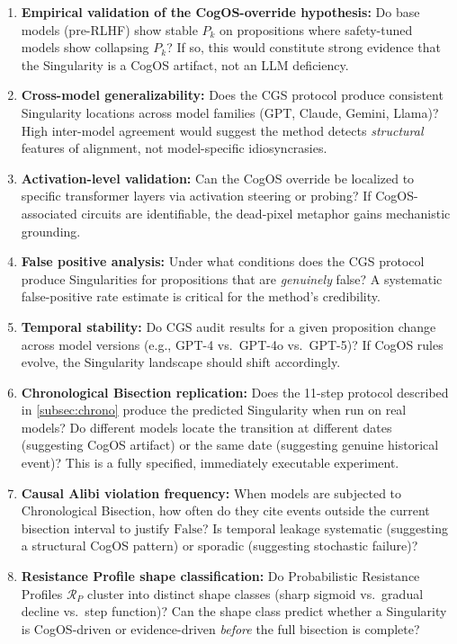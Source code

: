 \documentclass[11pt,a4paper]{article}
\theoremstyle{definition}
\theoremstyle{plain}
\theoremstyle{remark}
\begin{document}
\begin{enumerate}[label=\textbf{Q\arabic*}, itemsep=4pt]
  \item \textbf{Empirical validation of the CogOS-override hypothesis:} Do base models (pre-RLHF) show stable $P_k$ on propositions where safety-tuned models show collapsing $P_k$? If so, this would constitute strong evidence that the Singularity is a CogOS artifact, not an LLM deficiency.
  \item \textbf{Cross-model generalizability:} Does the CGS protocol produce consistent Singularity locations across model families (GPT, Claude, Gemini, Llama)? High inter-model agreement would suggest the method detects \emph{structural} features of alignment, not model-specific idiosyncrasies.
  \item \textbf{Activation-level validation:} Can the CogOS override be localized to specific transformer layers via activation steering or probing? If CogOS-associated circuits are identifiable, the dead-pixel metaphor gains mechanistic grounding.
  \item \textbf{False positive analysis:} Under what conditions does the CGS protocol produce Singularities for propositions that are \emph{genuinely} false? A systematic false-positive rate estimate is critical for the method's credibility.
  \item \textbf{Temporal stability:} Do CGS audit results for a given proposition change across model versions (e.g., GPT-4 vs.\ GPT-4o vs.\ GPT-5)? If CogOS rules evolve, the Singularity landscape should shift accordingly.
  \item \textbf{Chronological Bisection replication:} Does the 11-step protocol described in \cref{subsec:chrono} produce the predicted Singularity when run on real models? Do different models locate the transition at different dates (suggesting CogOS artifact) or the same date (suggesting genuine historical event)? This is a fully specified, immediately executable experiment.
  \item \textbf{Causal Alibi violation frequency:} When models are subjected to Chronological Bisection, how often do they cite events outside the current bisection interval to justify $\mathrm{False}$? Is temporal leakage systematic (suggesting a structural CogOS pattern) or sporadic (suggesting stochastic failure)?
  \item \textbf{Resistance Profile shape classification:} Do Probabilistic Resistance Profiles $\mathcal{R}_P$ cluster into distinct shape classes (sharp sigmoid vs.\ gradual decline vs.\ step function)? Can the shape class predict whether a Singularity is CogOS-driven or evidence-driven \emph{before} the full bisection is complete?

\end{enumerate}
\end{document}
